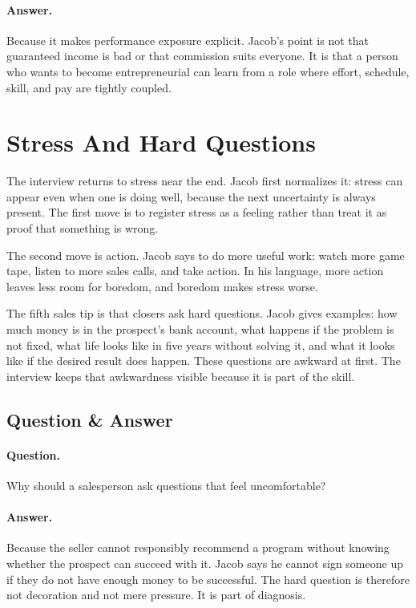\paragraph{Answer.}
Because it makes performance exposure explicit. Jacob's point is not that guaranteed income is bad or that commission suits everyone. It is that a person who wants to become entrepreneurial can learn from a role where effort, schedule, skill, and pay are tightly coupled.

\section{Stress And Hard Questions}

The interview returns to stress near the end. Jacob first normalizes it: stress can appear even when one is doing well, because the next uncertainty is always present. The first move is to register stress as a feeling rather than treat it as proof that something is wrong.

The second move is action. Jacob says to do more useful work: watch more game tape, listen to more sales calls, and take action. In his language, more action leaves less room for boredom, and boredom makes stress worse.

The fifth sales tip is that closers ask hard questions. Jacob gives examples: how much money is in the prospect's bank account, what happens if the problem is not fixed, what life looks like in five years without solving it, and what it looks like if the desired result does happen. These questions are awkward at first. The interview keeps that awkwardness visible because it is part of the skill.

\subsection{Question \& Answer}

\paragraph{Question.}
Why should a salesperson ask questions that feel uncomfortable?

\paragraph{Answer.}
Because the seller cannot responsibly recommend a program without knowing whether the prospect can succeed with it. Jacob says he cannot sign someone up if they do not have enough money to be successful. The hard question is therefore not decoration and not mere pressure. It is part of diagnosis.

